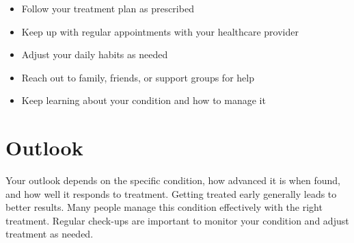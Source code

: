 \begin{itemize}[noitemsep]
  \item Follow your treatment plan as prescribed
  \item Keep up with regular appointments with your healthcare provider
  \item Adjust your daily habits as needed
  \item Reach out to family, friends, or support groups for help
  \item Keep learning about your condition and how to manage it
\end{itemize}

\section{Outlook}
Your outlook depends on the specific condition, how advanced it is when found, and how well it responds to treatment. Getting treated early generally leads to better results. Many people manage this condition effectively with the right treatment. Regular check-ups are important to monitor your condition and adjust treatment as needed.
